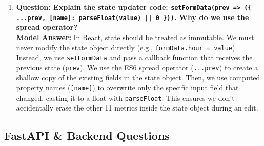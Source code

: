 \documentclass[11pt,a4paper]{article}
\begin{document}
\begin{enumerate}[leftmargin=*]
    \item \textbf{Question: Explain the state updater code: \texttt{setFormData(prev => (\{ ...prev, [name]: parseFloat(value) || 0 \}))}. Why do we use the spread operator?}
    \\ \textbf{Model Answer:} In React, state should be treated as immutable. We must never modify the state object directly (e.g., \texttt{formData.hour = value}). Instead, we use \texttt{setFormData} and pass a callback function that receives the previous state (\texttt{prev}). 
    We use the ES6 spread operator (\texttt{...prev}) to create a shallow copy of the existing fields in the state object. Then, we use computed property names (\texttt{[name]}) to overwrite only the specific input field that changed, casting it to a float with \texttt{parseFloat}. This ensures we don't accidentally erase the other 11 metrics inside the state object during an edit.
\end{enumerate}

\subsection{FastAPI \& Backend Questions}
\end{document}
